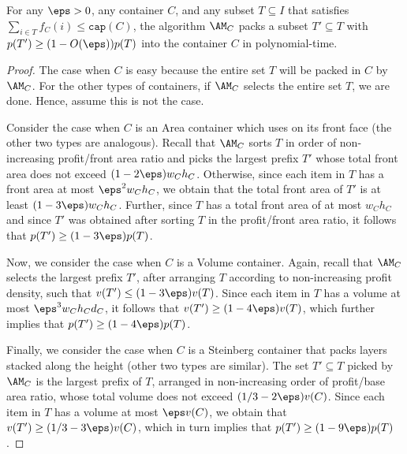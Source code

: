 \begin{lemma}
    For any $\eps >0$, any container $C$, and any subset $T\subseteq I$ that satisfies $\sum_{i\in T} f_C(i) \le \mathtt{cap}(C)$, the algorithm $\AM_C$ packs a subset $T' \subseteq T$ with $p(T') \ge (1-O(\eps))p(T)$ into the container $C$ in polynomial-time.
\end{lemma}
\begin{proof}
    The case when $C$ is  easy because the entire set $T$ will be packed in $C$ by $\AM_C$.
For the other types of containers, if $\AM_C$ selects the entire set $T$, we are done. Hence, assume this is not the case.

Consider the case when $C$ is an Area container which uses \NFDH on its front face (the other two types are analogous).
Recall that $\AM_C$ sorts $T$ in order of non-increasing profit/front area ratio and picks the largest prefix $T'$
whose total front area does not exceed $(1-2\eps)w_Ch_C$. Otherwise, since each item in $T$ has a front area at most $\eps^2w_Ch_C$,
we obtain that the total front area of $T'$ is at least $(1-3\eps)w_Ch_C$. Further, since $T$ has a total front area of at most $w_Ch_C$ and since $T'$ was obtained
after sorting $T$ in the profit/front area ratio, it follows that $p(T')\ge (1-3\eps)p(T)$.

Now, we consider the case when $C$ is a Volume container. Again, recall that $\AM_C$ selects the largest prefix $T'$, after arranging $T$ according to non-increasing profit density,
such that $v(T')\le (1-3\eps)v(T)$. Since each item in $T$ has a volume at most $\eps^3w_Ch_Cd_C$, it follows that $v(T')\ge (1-4\eps)v(T)$,
which further implies that $p(T')\ge (1-4\eps)p(T)$.

Finally, we consider the case when $C$ is a Steinberg container that packs layers stacked along the height (other two types are similar). 
The set $T'\subseteq T$ picked by $\AM_C$ is the largest prefix of $T$, arranged in non-increasing order of profit/base area ratio, whose
total volume does not exceed $(1/3-2\eps)v(C)$. Since each item in $T$ has a volume at most $\eps v(C)$,
we obtain that $v(T')\ge (1/3-3\eps)v(C)$, which in turn implies that $p(T')\ge (1-9\eps)p(T)$.
\end{proof}

